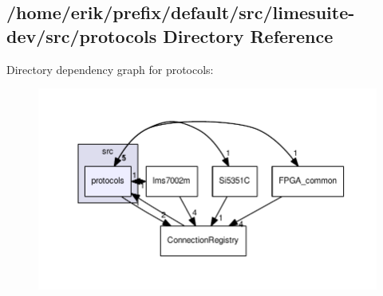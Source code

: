 \subsection{/home/erik/prefix/default/src/limesuite-\/dev/src/protocols Directory Reference}
\label{dir_66230539c384224b38d1983b3eaf864d}
Directory dependency graph for protocols\+:
\nopagebreak
\begin{figure}[H]
\begin{center}
\leavevmode
\includegraphics[width=350pt]{dir_66230539c384224b38d1983b3eaf864d_dep}
\end{center}
\end{figure}
